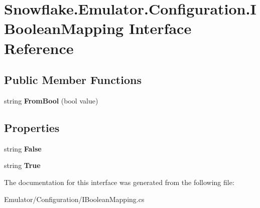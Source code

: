 \hypertarget{interface_snowflake_1_1_emulator_1_1_configuration_1_1_i_boolean_mapping}{}\section{Snowflake.\+Emulator.\+Configuration.\+I\+Boolean\+Mapping Interface Reference}
\label{interface_snowflake_1_1_emulator_1_1_configuration_1_1_i_boolean_mapping}
\subsection*{Public Member Functions}
\begin{DoxyCompactItemize}
\item 
\hypertarget{interface_snowflake_1_1_emulator_1_1_configuration_1_1_i_boolean_mapping_aaf1c79b24e1ffdc93f28480c0311a2e7}{}string {\bfseries From\+Bool} (bool value)\label{interface_snowflake_1_1_emulator_1_1_configuration_1_1_i_boolean_mapping_aaf1c79b24e1ffdc93f28480c0311a2e7}

\end{DoxyCompactItemize}
\subsection*{Properties}
\begin{DoxyCompactItemize}
\item 
\hypertarget{interface_snowflake_1_1_emulator_1_1_configuration_1_1_i_boolean_mapping_a3eb39b6c193f590968ec417ef7611d58}{}string {\bfseries False}\label{interface_snowflake_1_1_emulator_1_1_configuration_1_1_i_boolean_mapping_a3eb39b6c193f590968ec417ef7611d58}

\item 
\hypertarget{interface_snowflake_1_1_emulator_1_1_configuration_1_1_i_boolean_mapping_a29e8aa490a24a64acffcb2fb161e87a1}{}string {\bfseries True}\label{interface_snowflake_1_1_emulator_1_1_configuration_1_1_i_boolean_mapping_a29e8aa490a24a64acffcb2fb161e87a1}

\end{DoxyCompactItemize}


The documentation for this interface was generated from the following file\+:\begin{DoxyCompactItemize}
\item 
Emulator/\+Configuration/I\+Boolean\+Mapping.\+cs\end{DoxyCompactItemize}

